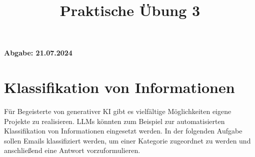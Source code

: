 \documentclass[12pt,ngerman]{AssignmentClass}
\title{Praktische Übung 3} %
\begin{document}
	\maketitle

    \noindent %
    \begin{tcolorbox}[colback=gray!20, %
                      colframe=gray!20, %
                      boxrule=0pt, %
                      sharp corners, %
                      valign=center, %
                      halign=center, %
                      height=2cm] %
    \LARGE \bfseries Abgabe: 21.07.2024 %
    \end{tcolorbox}

    
\section{Klassifikation von Informationen}
    
Für Begeisterte von generativer KI gibt es vielfältige Möglichkeiten eigene Projekte zu realisieren. LLMs könnten zum Beispiel zur automatisierten Klassifikation von Informationen eingesetzt werden. 
In der folgenden Aufgabe sollen Emails klassifiziert werden, um einer Kategorie zugeordnet zu werden und anschließend eine Antwort vorzuformulieren. 
\end{document}
